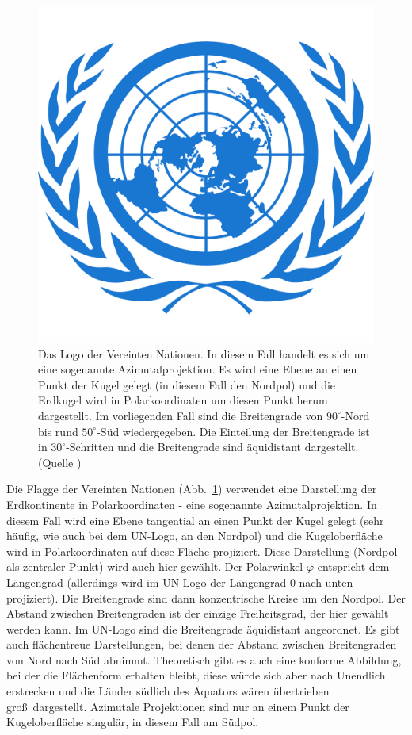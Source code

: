 \begin{figure}
\includegraphics[trim= 0cm 1.0cm 0cm 1.0cm,clip,scale=0.1]{./Bilder/un_PNG20.png}
\caption{\label{fig_UN}%
Das Logo der Vereinten Nationen. In diesem Fall handelt es sich um eine sogenannte
Azimutalprojektion. Es wird eine Ebene an einen Punkt der Kugel gelegt (in diesem Fall
den Nordpol) und die Erdkugel wird in Polarkoordinaten um diesen Punkt herum dargestellt. 
Im vorliegenden Fall sind die Breitengrade von $90^\circ$-Nord bis rund $50^\circ$-S\"ud wiedergegeben.
Die Einteilung der Breitengrade ist in $30^\circ$-Schritten und die Breitengrade sind
\"aquidistant dargestellt. (Quelle \cite{UN})}  
\end{figure}

Die Flagge der Vereinten Nationen (Abb.\ \ref{fig_UN})
verwendet eine Darstellung der Erdkontinente in Polarkoordinaten - eine sogenannte 
Azimutalprojektion.
In diesem Fall wird eine Ebene tangential an einen Punkt der Kugel gelegt (sehr h\"aufig, wie auch bei dem
UN-Logo, an den Nordpol) und die Kugeloberfl\"ache wird in Polarkoordinaten auf diese Fl\"ache
projiziert. Diese Darstellung (Nordpol als zentraler Punkt) wird auch hier gew\"ahlt.
Der Polarwinkel $\varphi$ entspricht dem L\"angengrad (allerdings wird im UN-Logo der
L\"angengrad $0$ nach unten projiziert). Die Breitengrade sind dann konzentrische Kreise um den
Nordpol. Der Abstand zwischen Breitengraden ist der einzige Freiheitsgrad, der hier gew\"ahlt
werden kann. Im UN-Logo sind die Breitengrade \"aquidistant angeordnet. Es gibt auch
fl\"achentreue Darstellungen, bei denen der Abstand zwischen Breitengraden von Nord nach
S\"ud abnimmt. Theoretisch gibt es auch eine konforme Abbildung, bei der die Fl\"achenform
erhalten bleibt, diese w\"urde sich aber nach Unendlich erstrecken und die L\"ander s\"udlich des
\"Aquators w\"aren \"ubertrieben gro\ss\ dargestellt. Azimutale Projektionen sind nur an einem
Punkt der Kugeloberfl\"ache singul\"ar, in diesem Fall am S\"udpol. 

